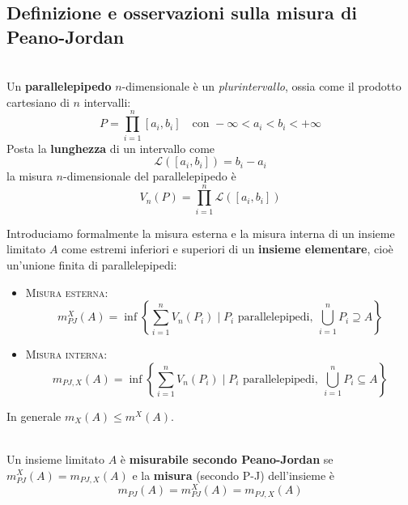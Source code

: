 \subsection{Definizione e osservazioni sulla misura di Peano-Jordan}
\begin{define}~{}\\
	Un \textbf{parallelepipedo} $n$-dimensionale è un \textit{plurintervallo}, ossia come il prodotto cartesiano di $n$ intervalli:
	\begin{equation}
		P=\prod_{i=1}^{n}\left[a_i,b_i\right]\quad\text{con }-\infty < a_i < b_i < +\infty
	\end{equation}
	Posta la \textbf{lunghezza} di un intervallo come
		\begin{equation}
			\mathcal{L}\left(\left[a_i,b_i\right]\right)=b_i-a_i
		\end{equation}
		la misura $n$-dimensionale del parallelepipedo è
		\begin{equation}
			V_n\left(P\right)=\prod_{i=1}^{n}\mathcal{L}\left(\left[a_i,b_i\right]\right)
		\end{equation}
	\end{define}
	Introduciamo formalmente la misura esterna e la misura interna di un insieme limitato $A$ come estremi inferiori e superiori di un \textbf{insieme elementare}, cioè un'unione finita di parallelepipedi:
	\begin{itemize}
		\item \textsc{Misura esterna}: \begin{equation}
			m_{PJ}^X\left(A\right)=\inf\left\{\sum_{i=1}^{n}V_n\left(P_i\right)\mid P_i\text{ parallelepipedi},\ \bigcup_{i=1}^nP_i\supseteq A\right\}
		\end{equation}
		\item \textsc{Misura interna}:
		\begin{equation}
			m_{PJ,X}\left(A\right)=\inf\left\{\sum_{i=1}^{n}V_n\left(P_i\right)\mid P_i\text{ parallelepipedi},\ \bigcup_{i=1}^nP_i\subseteq A\right\}
		\end{equation}
	\end{itemize}
	In generale $m_X\left(A\right)\leq m^X\left(A\right)$.
	\begin{define}~{}\\
		Un insieme limitato $A$ è \textbf{misurabile secondo Peano-Jordan} se $m_{PJ}^X\left(A\right)=m_{PJ,X}\left(A\right)$ e la \textbf{misura} (secondo P-J) dell'insieme è
		\begin{equation}
			m_{PJ}\left(A\right)=m_{PJ}^X\left(A\right)=m_{PJ,X}\left(A\right)
		\end{equation}
	\end{define}
